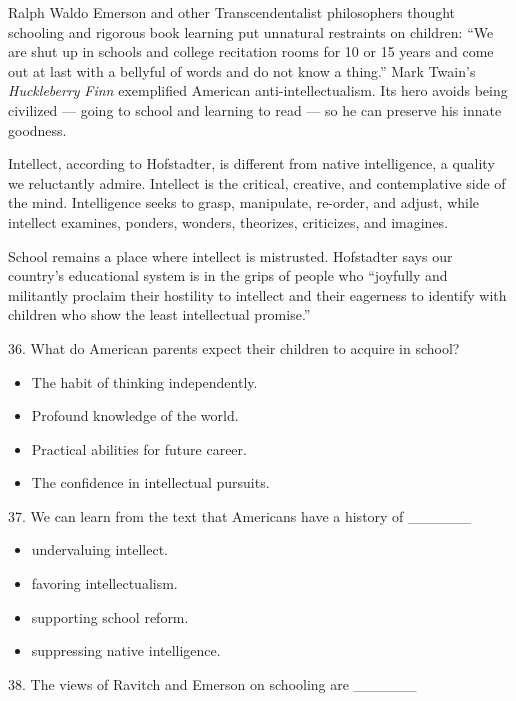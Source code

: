 \documentclass[UTF8,11pt]{ctexart}
\begin{document}
Ralph Waldo Emerson and other Transcendentalist philosophers thought schooling and rigorous book learning put unnatural restraints on children: “We are shut up in schools and college recitation rooms for 10 or 15 years and come out at last with a bellyful of words and do not know a thing.” Mark Twain’s \textit{Huckleberry} \textit{Finn} exemplified American anti-intellectualism. Its hero avoids being civilized — going to school and learning to read — so he can preserve his innate goodness.


Intellect, according to Hofstadter, is different from native intelligence, a quality we reluctantly admire. Intellect is the critical, creative, and contemplative side of the mind. Intelligence seeks to grasp, manipulate, re-order, and adjust, while intellect examines, ponders, wonders, theorizes, criticizes, and imagines.


School remains a place where intellect is mistrusted. Hofstadter says our country’s educational system is in the grips of people who “joyfully and militantly proclaim their hostility to intellect and their eagerness to identify with children who show the least intellectual promise.”


36. What do American parents expect their children to acquire in school?


\begin{itemize}[leftmargin=2em,itemsep=.2em,topsep=.4em]\item[A.] The habit of thinking independently.
\item[B.] Profound knowledge of the world.
\item[C.] Practical abilities for future career.
\item[D.] The confidence in intellectual pursuits.
\end{itemize}

37. We can learn from the text that Americans have a history of \_\_\_\_\_\_


\begin{itemize}[leftmargin=2em,itemsep=.2em,topsep=.4em]\item[A.] undervaluing intellect.
\item[B.] favoring intellectualism.
\item[C.] supporting school reform.
\item[D.] suppressing native intelligence.
\end{itemize}

38. The views of Ravitch and Emerson on schooling are \_\_\_\_\_\_
\end{document}

